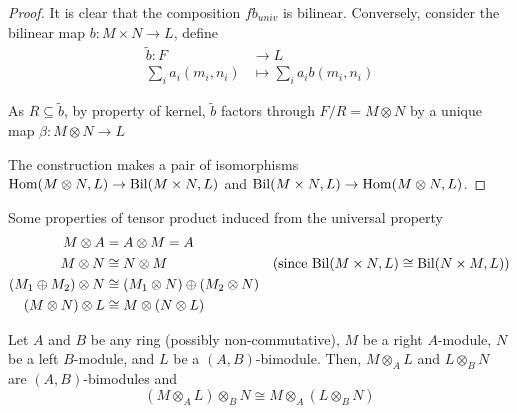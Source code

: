 \begin{proof}
	It is clear that the composition $f b_{univ}$ is bilinear. Conversely, consider the bilinear map $b: M \times N \to L$, define
	\begin{align*}
		\tilde{b}: F &\to L \\
		\sum_{i} a_i (m_i, n_i) &\mapsto \sum_{i} a_i b(m_i, n_i)
	\end{align*}
	
	As $R \subseteq \tilde{b}$, by property of kernel, $\tilde{b}$ factors through $F / R = M \otimes N$ by a unique map $\beta: M \otimes N \to L$
	\begin{center}
	\end{center}
	
	The construction makes a pair of isomorphisms $\operatorname{Hom}(M \otimes N, L) \to \operatorname{Bil}(M \times N, L)$ and $\operatorname{Bil}(M \times N, L) \to \operatorname{Hom}(M \otimes N, L)$.
\end{proof}

\begin{proposition}
	Some properties of tensor product induced from the universal property
	\begin{align*}
		M \otimes A &= A \otimes M = A \\
		M \otimes N &\cong N \otimes M &\text{(since $\operatorname{Bil}(M \times N, L) \cong \operatorname{Bil}(N \times M, L)$)} \\
		(M_1 \oplus M_2) \otimes N &\cong (M_1 \otimes N) \oplus (M_2 \otimes N) \\
		(M \otimes N) \otimes L &\cong M \otimes (N \otimes L)
	\end{align*}
\end{proposition}

\begin{remark}
	Let $A$ and $B$ be any ring (possibly non-commutative), $M$ be a right $A$-module, $N$ be a left $B$-module, and $L$ be a $(A, B)$-bimodule. Then, $M \otimes_A L$ and $L \otimes_B N$ are $(A, B)$-bimodules and 
	$$
		(M \otimes_A L) \otimes_B N \cong M \otimes_A (L \otimes_B N)
	$$
\end{remark}

